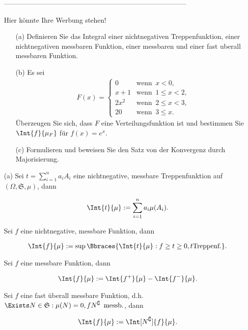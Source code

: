 --------------------------------------------------------------------------------

\begin{exercise}

Hier könnte Ihre Werbung stehen!

\begin{itemize}
  \item[(a)] Definieren Sie das Integral einer nichtnegativen Treppenfunktion, einer nichtnegativen messbaren Funktion, einer messbaren und einer fast uberall messbaren Funktion.
  \item[(b)] Es sei
  \begin{align*}
    F(x) =
    \begin{cases}
      0     & \text{wenn} \enspace  x < 0, \\
      x + 1 & \text{wenn} \enspace 1 \leq x < 2, \\
      2x^2  & \text{wenn} \enspace 2 \leq x < 3, \\
      20    & \text{wenn} \enspace 3 \leq x.
    \end{cases}
  \end{align*}
  Überzeugen Sie sich, dass $F$ eine Verteilungsfunktion ist und bestimmen Sie $\Int{f}{\mu_F}$ für $f(x) = e^x$.
  \item[(c)] Formulieren und beweisen Sie den Satz von der Konvergenz durch Majorisierung.
\end{itemize}

\end{exercise}

\begin{solution}

(a) Sei $t = \sum_{i=1}^n a_i A_i$ eine nichtnegative, messbare Treppenfunktion auf $(\Omega, \mathfrak{S}, \mu)$, dann

\begin{align*}
  \Int{t}{\mu} := \sum_{i=1}^n a_i \mu(A_i).
\end{align*}

Sei $f$ eine nichtnegative, messbare Funktion, dann

\begin{align*}
  \Int{f}{\mu} := \sup \Bbraces{\Int{t}{\mu}: f \geq t \geq 0, t \text{Treppenf.}}.
\end{align*}

Sei $f$ eine messbare Funktion, dann

\begin{align*}
  \Int{f}{\mu} := \Int{f^+}{\mu} - \Int{f^-}{\mu}.
\end{align*}

Sei $f$ eine fast überall messbare Funktion, d.h. $\Exists N \in \mathfrak{S}: \mu(N) = 0, fN^\complement \enspace \text{messb.}$, dann

\begin{align*}
  \Int{f}{\mu} := \Int[N^\complement]{f}{\mu}.
\end{align*}

\end{solution}

